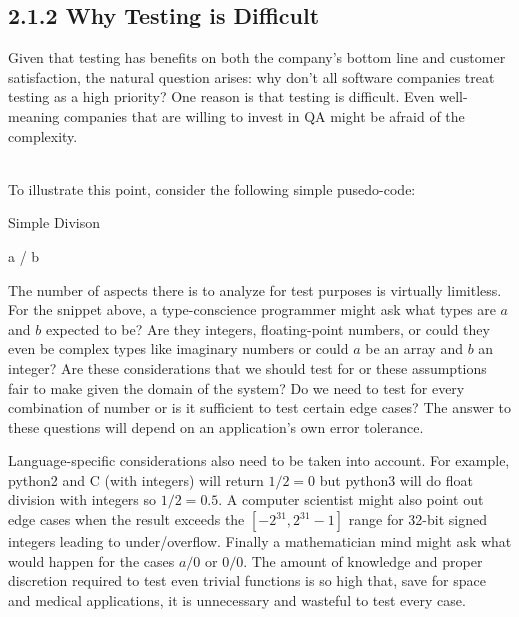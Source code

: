 \documentclass[12pt]{report}
\begin{document}
\subsection*{2.1.2 Why Testing is Difficult}
\par\noindent
Given that testing has benefits on both the company's bottom line and customer satisfaction, the natural question arises: why don't all software companies treat testing as a high priority? One reason is that testing is difficult. Even well-meaning companies that are willing to invest in QA might be afraid of the complexity.
\par\indent \\
To illustrate this point, consider the following simple pusedo-code:

\begin{algorithm}
	\caption{Simple Divison}
	\begin{algorithmic}
	
	  \State \Return a / b
	\EndFunction
	\end{algorithmic}
\end{algorithm}

\par\noindent
The number of aspects there is to analyze for test purposes is virtually limitless. For the snippet above, a type-conscience programmer might ask what types are $a$ and $b$ expected to be? Are they integers, floating-point numbers, or could they even be complex types like imaginary numbers or could $a$ be an array and $b$ an integer? Are these considerations that we should test for or these assumptions fair to make given the domain of the system? Do we need to test for every combination of number or is it sufficient to test certain edge cases? The answer to these questions will depend on an application's own error tolerance. \\

\par\noindent
Language-specific considerations also need to be taken into account. For example, python2 and C (with integers) will return $1 / 2 = 0$ but python3 will do float division with integers so $1 / 2 = 0.5$. A computer scientist might also point out edge cases when the result exceeds the $[-2^{31}, 2^{31}-1]$ range for 32-bit signed integers leading to under/overflow. Finally a mathematician mind might ask what would happen for the cases $a/0$ or $0/0$. The amount of knowledge and proper discretion required to test even trivial functions is so high that, save for space and medical applications, it is unnecessary and wasteful to test every case.
\end{document}
